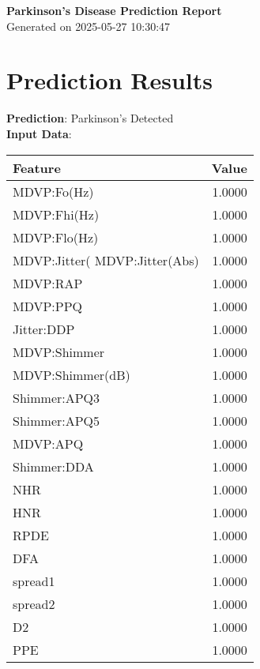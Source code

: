 \documentclass[a4paper,10pt]{article}
\begin{document}
\begin{center}
    \textbf{\Large Parkinson's Disease Prediction Report} \\
    \vspace{0.2cm}
    Generated on 2025-05-27 10:30:47
\end{center}

\section*{Prediction Results}

\textbf{Prediction}: Parkinson's Detected \\
\vspace{0.2cm}
\textbf{Input Data}: \\
\begin{tabular}{lr}
\toprule
Feature & Value \\
\midrule
MDVP:Fo(Hz) & 1.0000 \\ 
MDVP:Fhi(Hz) & 1.0000 \\ 
MDVP:Flo(Hz) & 1.0000 \\ 
MDVP:Jitter(%
MDVP:Jitter(Abs) & 1.0000 \\ 
MDVP:RAP & 1.0000 \\ 
MDVP:PPQ & 1.0000 \\ 
Jitter:DDP & 1.0000 \\ 
MDVP:Shimmer & 1.0000 \\ 
MDVP:Shimmer(dB) & 1.0000 \\ 
Shimmer:APQ3 & 1.0000 \\ 
Shimmer:APQ5 & 1.0000 \\ 
MDVP:APQ & 1.0000 \\ 
Shimmer:DDA & 1.0000 \\ 
NHR & 1.0000 \\ 
HNR & 1.0000 \\ 
RPDE & 1.0000 \\ 
DFA & 1.0000 \\ 
spread1 & 1.0000 \\ 
spread2 & 1.0000 \\ 
D2 & 1.0000 \\ 
PPE & 1.0000 \\ 

\bottomrule
\end{tabular}
\end{document}
